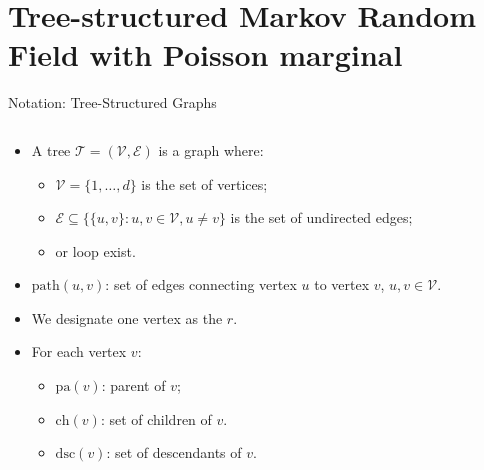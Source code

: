 \documentclass[11pt,xcolor={dvipsnames},hyperref={pdftex,pdfpagemode=UseNone,hidelinks,pdfdisplaydoctitle=true},usepdftitle=false]{beamer}
\begin{document}
\section{Tree-structured Markov Random Field with Poisson marginal}
\begin{frame}{Notation: Tree-Structured Graphs}
\begin{columns}
    \begin{column}{0.6\textwidth}
        \begin{itemize}
            \item A tree $\mathcal{T}=(\mathcal{V},\mathcal{E})$ is a graph where:
            \begin{itemize}
                \item $\mathcal{V}=\{1,\ldots,d\}$ is the set of vertices;
            \item $\mathcal{E} \subseteq \{\{u,v\} : u,v \in \mathcal{V}, u \neq v\}$ is the set of undirected edges;
            \item {} or loop exist.
            \end{itemize}
            \item $\mathrm{path}(u, v)$: set of edges connecting vertex $u$ to vertex $v$, $u,v \in \mathcal{V}$.
            \item We designate one vertex as the  $r$.
            \item For each vertex $v$:
            \begin{itemize}
                \item $\mathrm{pa}(v)$: parent of $v$;
                \item $\mathrm{ch}(v)$: set of children of $v$.
                \item $\mathrm{dsc}(v)$: set of descendants of $v$.
            \end{itemize}
        \end{itemize}
    \end{column}
    \begin{column}{0.4\textwidth}
    \end{column}
\end{columns}
\end{frame}
\end{document}
